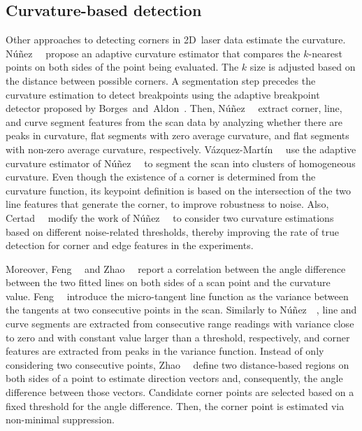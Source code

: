 \subsection{Curvature-based detection}\label{sec:features:background:curvature}

Other approaches to detecting corners in 2D~laser data estimate the curvature.
N\'{u}\~{n}ez~\etal~\cite{nunez:icra:2006} propose an adaptive curvature
estimator that compares the $k$-nearest points on
both sides of the point being evaluated.
The $k$ size is adjusted based on the distance between possible corners.
A segmentation step precedes the curvature estimation to detect breakpoints
using the adaptive breakpoint detector proposed by
Borges~and~Aldon~\cite{borges-aldon:jint:2004}.
Then, N\'{u}\~{n}ez~\etal~\cite{nunez:icra:2006} extract corner, line, and
curve segment features from the scan data by analyzing whether
there are peaks in curvature, flat segments with zero average curvature,
and flat segments with non-zero average curvature, respectively.
V\'{a}zquez-Mart\'{i}n~\etal~\cite{vazquez-martin:sensors:2009} use
the adaptive curvature estimator of N\'{u}\~{n}ez~\etal~\cite{nunez:icra:2006}
to segment the scan into clusters of homogeneous curvature.
Even though the existence of a corner is determined from the curvature function,
its keypoint definition is based on the intersection of the two line features
that generate the corner, to improve robustness to noise.
Also, Certad~\etal~\cite{certad:andescon:2012} modify the work of
N\'{u}\~{n}ez~\etal~\cite{nunez:icra:2006} to consider
two curvature estimations based on different noise-related thresholds,
thereby improving the rate of true detection for
corner and edge features in the experiments.

Moreover, Feng~\etal~\cite{feng:aici:2009} and
Zhao~\etal~\cite{zhao:icsess:2016} report a correlation between
the angle difference between the two fitted lines on
both sides of a scan point and the curvature value.
Feng~\etal~\cite{feng:aici:2009} introduce the micro-tangent line function
as the variance between the tangents at two consecutive points in the scan.
Similarly to N\'{u}\~{n}ez~\etal~\cite{nunez:icra:2006},
line and curve segments are extracted from consecutive range readings
with variance close to zero and with constant value larger than a threshold,
respectively, and corner features are extracted from peaks in the variance
function. Instead of only considering two consecutive points,
Zhao~\etal~\cite{zhao:icsess:2016} define two distance-based regions on
both sides of a point to estimate direction vectors and,
consequently, the angle difference between those vectors.
Candidate corner points are selected based on a fixed threshold
for the angle difference. Then, the corner point is estimated
via non-minimal suppression.

